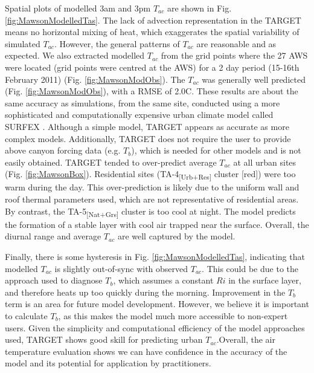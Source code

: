 \documentclass[gmd, manuscript]{copernicus}
\begin{document}
Spatial plots of modelled 3am and 3pm $T_{ac}$ are shown in Fig. \ref{fig:MawsonModelledTas}. The lack of advection representation in the TARGET  means no horizontal mixing of heat, which exaggerates the spatial variability of simulated $T_{ac}$. However, the general patterns of $T_{ac}$ are reasonable and as expected. We also extracted modelled $T_{ac}$ from the grid points where the 27 AWS were located (grid points were centred at the AWS) for a 2 day period (15-16th February 2011) (Fig. \ref{fig:MawsonModObs}). The $T_{ac}$ was generally well predicted (Fig. \ref{fig:MawsonModObs}), with a RMSE of 2.0\degree C. These results are about the same accuracy as simulations, from the same site, conducted using a more sophisticated and computationally expensive urban climate model called SURFEX \citep{Broadbent}.   Although a simple model, TARGET appears as accurate as more complex models. Additionally, TARGET does not require the user to provide  above canyon forcing data (e.g. \ensuremath{T_{b}}), which is needed for other  models and is  not easily obtained.  TARGET  tended  to over-predict average $T_{ac}$ at all urban sites (Fig. \ref{fig:MawsonBox}).  Residential sites ({TA-4\textsubscript{[Urb+Res]} } cluster [red]) were  too warm during the day. This over-prediction is likely due to the uniform wall and roof thermal parameters used, which are not representative of residential areas. By contrast, the {TA-5\textsubscript{[Nat+Grs]} } cluster is too cool at night. The model predicts the formation of a stable layer with cool air trapped near the surface. Overall, the diurnal range and average $T_{ac}$ are well captured by the model. 

Finally, there is some hysteresis in Fig. \ref{fig:MawsonModelledTas}, indicating that modelled $T_{ac}$ is slightly out-of-sync with observed $T_{ac}$. This could be due to the approach used to  diagnose \ensuremath{T_{b}}, which assumes a constant \ensuremath{Ri} in the surface layer, and therefore heats up too quickly during the morning. Improvement in the \ensuremath{T_{b}}  term is  an area for future model development. However, we believe it is important to calculate \ensuremath{T_{b}}, as this makes the model much more accessible to non-expert users. Given the simplicity and computational efficiency of the model approaches used, TARGET shows good skill for predicting urban $T_{ac}$.Overall, the air temperature evaluation shows we can have confidence in the accuracy of the model and its potential for application by practitioners. 
\end{document}
